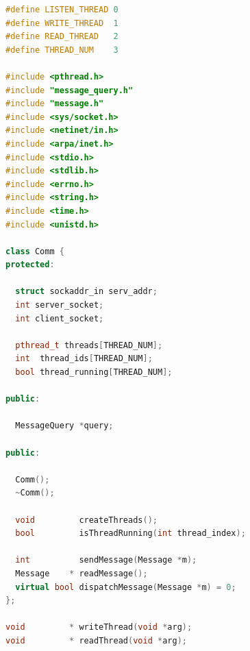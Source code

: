 \documentclass[11pt,a4paper,titlepage]{report}
\begin{document}
\begin{lstlisting}[caption=comm.h,language=C++]
#define LISTEN_THREAD 0
#define WRITE_THREAD  1
#define READ_THREAD   2
#define THREAD_NUM    3

#include <pthread.h>
#include "message_query.h"
#include "message.h"
#include <sys/socket.h>
#include <netinet/in.h>
#include <arpa/inet.h>
#include <stdio.h>
#include <stdlib.h>
#include <errno.h>
#include <string.h>
#include <time.h>
#include <unistd.h>

class Comm {
protected:

  struct sockaddr_in serv_addr;
  int server_socket;
  int client_socket;

  pthread_t threads[THREAD_NUM];
  int  thread_ids[THREAD_NUM];
  bool thread_running[THREAD_NUM];

public:

  MessageQuery *query;

public:

  Comm();
  ~Comm();

  void         createThreads();
  bool         isThreadRunning(int thread_index);

  int          sendMessage(Message *m);
  Message    * readMessage();
  virtual bool dispatchMessage(Message *m) = 0;
};

void         * writeThread(void *arg);
void         * readThread(void *arg);

\end{lstlisting}
\end{document}
